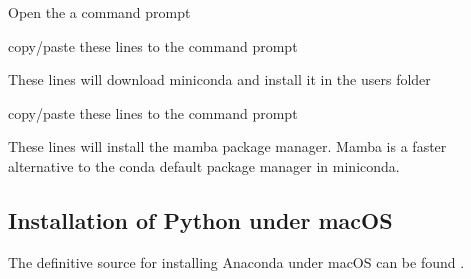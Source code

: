 \documentclass[letterpaper,10pt,english]{jupyterBook}
\begin{document}
\sphinxAtStartPar
Open the a command prompt

\sphinxAtStartPar
{} copy/paste these lines to the command prompt

\begin{sphinxVerbatim}[commandchars=\\\{\}]
    \PYGZbs{}
\PYGZbs{}  \PYGZbs{}

\end{sphinxVerbatim}

\sphinxAtStartPar
These lines will download miniconda and install it in the users folder

\sphinxAtStartPar
{} copy/paste these lines to the command prompt

\begin{sphinxVerbatim}[commandchars=\\\{\}]
 \PYGZbs{}\PYGZbs{}\PYGZbs{} \PYGZbs{}
      

\end{sphinxVerbatim}

\sphinxAtStartPar
These lines will install the mamba package manager. Mamba is a faster alternative to the conda default package manager in miniconda.


\subsection{Installation of Python under macOS}
\label{\detokenize{content/03_Installation/Installing:installation-of-python-under-macos}}
\sphinxAtStartPar
The definitive source for installing Anaconda under macOS can be found .
\end{document}
